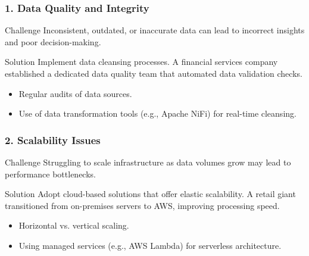 \documentclass[aspectratio=169]{beamer}
\begin{document}
\begin{frame}[fragile]
    \frametitle{1. Data Quality and Integrity}
    \begin{block}{Challenge}
        Inconsistent, outdated, or inaccurate data can lead to incorrect insights and poor decision-making.
    \end{block}
    
    \begin{block}{Solution}
        Implement data cleansing processes. 
        A financial services company established a dedicated data quality team that automated data validation checks.
    \end{block}
    
    \begin{itemize}
        \item Regular audits of data sources.
        \item Use of data transformation tools (e.g., Apache NiFi) for real-time cleansing.
    \end{itemize}
\end{frame}

\begin{frame}[fragile]
    \frametitle{2. Scalability Issues}
    \begin{block}{Challenge}
        Struggling to scale infrastructure as data volumes grow may lead to performance bottlenecks.
    \end{block}
    
    \begin{block}{Solution}
        Adopt cloud-based solutions that offer elastic scalability. 
        A retail giant transitioned from on-premises servers to AWS, improving processing speed.
    \end{block}
    
    \begin{itemize}
        \item Horizontal vs. vertical scaling.
        \item Using managed services (e.g., AWS Lambda) for serverless architecture.
    \end{itemize}
\end{frame}
\end{document}
